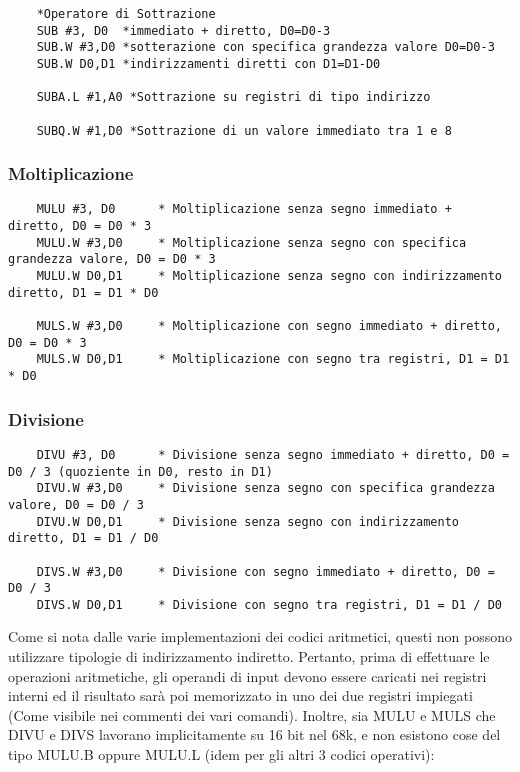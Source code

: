 \begin{lstlisting}
    *Operatore di Sottrazione
    SUB #3, D0  *immediato + diretto, D0=D0-3
    SUB.W #3,D0 *sotterazione con specifica grandezza valore D0=D0-3
    SUB.W D0,D1 *indirizzamenti diretti con D1=D1-D0

    SUBA.L #1,A0 *Sottrazione su registri di tipo indirizzo

    SUBQ.W #1,D0 *Sottrazione di un valore immediato tra 1 e 8
\end{lstlisting}

\subsubsection{Moltiplicazione}

\begin{lstlisting}
    MULU #3, D0      * Moltiplicazione senza segno immediato + diretto, D0 = D0 * 3
    MULU.W #3,D0     * Moltiplicazione senza segno con specifica grandezza valore, D0 = D0 * 3
    MULU.W D0,D1     * Moltiplicazione senza segno con indirizzamento diretto, D1 = D1 * D0

    MULS.W #3,D0     * Moltiplicazione con segno immediato + diretto, D0 = D0 * 3
    MULS.W D0,D1     * Moltiplicazione con segno tra registri, D1 = D1 * D0
\end{lstlisting}

\subsubsection{Divisione}

\begin{lstlisting}
    DIVU #3, D0      * Divisione senza segno immediato + diretto, D0 = D0 / 3 (quoziente in D0, resto in D1)
    DIVU.W #3,D0     * Divisione senza segno con specifica grandezza valore, D0 = D0 / 3
    DIVU.W D0,D1     * Divisione senza segno con indirizzamento diretto, D1 = D1 / D0

    DIVS.W #3,D0     * Divisione con segno immediato + diretto, D0 = D0 / 3
    DIVS.W D0,D1     * Divisione con segno tra registri, D1 = D1 / D0
\end{lstlisting}

Come si nota dalle varie implementazioni dei codici aritmetici, questi non possono utilizzare tipologie di indirizzamento indiretto. Pertanto, prima di effettuare le operazioni aritmetiche, gli operandi di input devono essere caricati nei registri interni ed il risultato sarà poi memorizzato in uno dei due registri impiegati (Come visibile nei commenti dei vari comandi).
Inoltre, sia MULU e MULS che DIVU e DIVS lavorano implicitamente su 16 bit nel 68k, e non esistono cose del tipo MULU.B oppure MULU.L (idem per gli altri 3 codici operativi):

